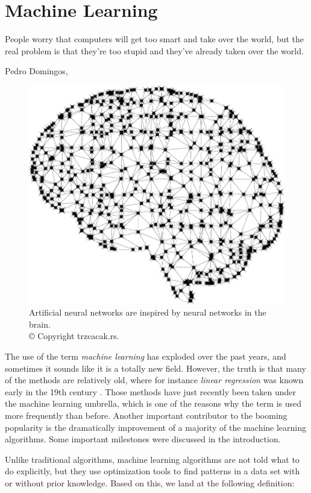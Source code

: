 \chapter{Machine Learning} \label{chp:machinelearning}
\epigraph{People worry that computers will get too smart and take over the world, but the real problem is that they're too stupid and they've already taken over the world.}{Pedro Domingos, }
\begin{figure}[H]
	\centering
	\includegraphics[scale=0.25]{Images/brain.png}
	\caption{Artificial neural networks are inspired by neural networks in the brain.\\ © Copyright trzcacak.rs.}
\end{figure}

The use of the term \textit{machine learning} has exploded over the past years, and sometimes it sounds like it is a totally new field. However, the truth is that many of the methods are relatively old, where for instance \textit{linear regression} was known early in the 19th century \cite{legendre_nouvelles_1805, gauss_theoria_1809}. Those methods have just recently been taken under the machine learning umbrella, which is one of the reasons why the term is used more frequently than before. Another important contributor to the booming popularity is the dramatically improvement of a majority of the machine learning algorithms. Some important milestones were discussed in the introduction. 

Unlike traditional algorithms, machine learning algorithms are not told what to do explicitly, but they use optimization tools to find patterns in a data set with or without prior knowledge. Based on this, we land at the following definition:

